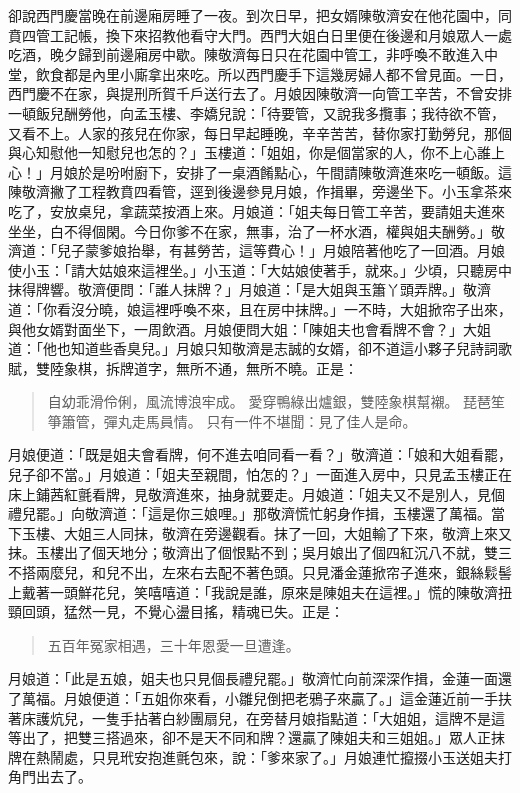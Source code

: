 卻說西門慶當晚在前邊廂房睡了一夜。到次日早，把女婿陳敬濟安在他花園中，同賁四管工記帳，換下來招教他看守大門。西門大姐白日里便在後邊和月娘眾人一處吃酒，晚夕歸到前邊廂房中歇。陳敬濟每日只在花園中管工，非呼喚不敢進入中堂，飲食都是內里小廝拿出來吃。所以西門慶手下這幾房婦人都不曾見面。一日，西門慶不在家，與提刑所賀千戶送行去了。月娘因陳敬濟一向管工辛苦，不曾安排一頓飯兒酬勞他，向孟玉樓、李嬌兒說：「待要管，又說我多攬事；我待欲不管，又看不上。人家的孩兒在你家，每日早起睡晚，辛辛苦苦，替你家打勤勞兒，那個與心知慰他一知慰兒也怎的？」玉樓道：「姐姐，你是個當家的人，你不上心誰上心！」月娘於是吩咐廚下，安排了一桌酒餚點心，午間請陳敬濟進來吃一頓飯。這陳敬濟撇了工程教賁四看管，逕到後邊參見月娘，作揖畢，旁邊坐下。小玉拿茶來吃了，安放桌兒，拿蔬菜按酒上來。月娘道：「姐夫每日管工辛苦，要請姐夫進來坐坐，白不得個閑。今日你爹不在家，無事，治了一杯水酒，權與姐夫酬勞。」敬濟道：「兒子蒙爹娘抬舉，有甚勞苦，這等費心！」月娘陪著他吃了一回酒。月娘使小玉：「請大姑娘來這裡坐。」小玉道：「大姑娘使著手，就來。」少頃，只聽房中抹得牌響。敬濟便問：「誰人抹牌？」月娘道：「是大姐與玉簫丫頭弄牌。」敬濟道：「你看沒分曉，娘這裡呼喚不來，且在房中抹牌。」一不時，大姐掀帘子出來，與他女婿對面坐下，一周飲酒。月娘便問大姐：「陳姐夫也會看牌不會？」大姐道：「他也知道些香臭兒。」月娘只知敬濟是志誠的女婿，卻不道這小夥子兒詩詞歌賦，雙陸象棋，拆牌道字，無所不通，無所不曉。正是：
\begin{quote}
自幼乖滑伶俐，風流博浪牢成。
愛穿鴨綠出爐銀，雙陸象棋幫襯。
琵琶笙箏簫管，彈丸走馬員情。
只有一件不堪聞：見了佳人是命。
\end{quote}

月娘便道：「既是姐夫會看牌，何不進去咱同看一看？」敬濟道：「娘和大姐看罷，兒子卻不當。」月娘道：「姐夫至親間，怕怎的？」一面進入房中，只見孟玉樓正在床上鋪茜紅氈看牌，見敬濟進來，抽身就要走。月娘道：「姐夫又不是別人，見個禮兒罷。」向敬濟道：「這是你三娘哩。」那敬濟慌忙躬身作揖，玉樓還了萬福。當下玉樓、大姐三人同抹，敬濟在旁邊觀看。抹了一回，大姐輸了下來，敬濟上來又抹。玉樓出了個天地分；敬濟出了個恨點不到；吳月娘出了個四紅沉八不就，雙三不搭兩麼兒，和兒不出，左來右去配不著色頭。只見潘金蓮掀帘子進來，銀絲鬏髻上戴著一頭鮮花兒，笑嘻嘻道：「我說是誰，原來是陳姐夫在這裡。」慌的陳敬濟扭頸回頭，猛然一見，不覺心盪目搖，精魂已失。正是：
\begin{quote}
五百年冤家相遇，三十年恩愛一旦遭逢。
\end{quote}
月娘道：「此是五娘，姐夫也只見個長禮兒罷。」敬濟忙向前深深作揖，金蓮一面還了萬福。月娘便道：「五姐你來看，小雛兒倒把老鴉子來贏了。」這金蓮近前一手扶著床護炕兒，一隻手拈著白紗團扇兒，在旁替月娘指點道：「大姐姐，這牌不是這等出了，把雙三搭過來，卻不是天不同和牌？還贏了陳姐夫和三姐姐。」眾人正抹牌在熱鬧處，只見玳安抱進氈包來，說：「爹來家了。」月娘連忙攛掇小玉送姐夫打角門出去了。

